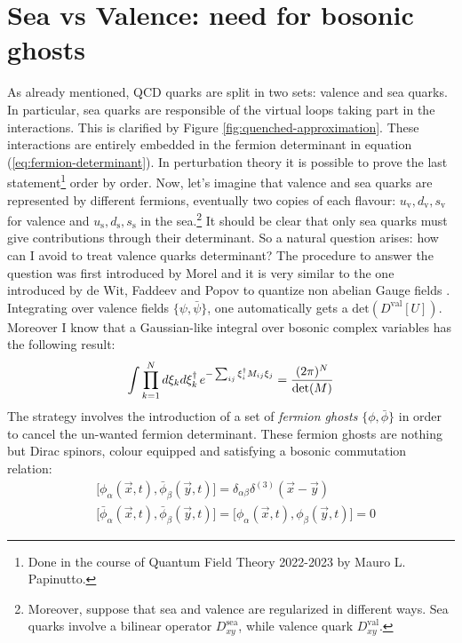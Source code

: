 \documentclass[english, LaM, oneside, noexaminfo]{sapthesis}
\begin{document}
\section{Sea vs Valence: need for bosonic ghosts}\label{sec:ghosts}
\noindent
As already mentioned, QCD quarks are split in two sets: valence and sea quarks.
In particular, sea quarks are responsible of the virtual loops taking part in the interactions.
This is clarified by Figure \ref{fig:quenched-approximation}.
These interactions are entirely embedded in the fermion determinant in equation (\ref{eq:fermion-determinant}).
In perturbation theory it is possible to prove the last statement\footnote{Done in the course of Quantum Field Theory 2022-2023 by Mauro L. Papinutto.} order by order.
Now, let's imagine that valence and sea quarks are represented by different fermions, eventually two copies of each flavour: $u_\text{v}, d_\text{v}, s_\text{v}$ for valence and $u_\text{s}, d_\text{s}, s_\text{s}$ in the sea.\footnote{Moreover, suppose that sea and valence are regularized in different ways. Sea quarks involve a bilinear operator $D^\text{sea}_{xy}$, while valence quark $D^\text{val}_{xy}$.}
It should be clear that only sea quarks must give contributions through their determinant.
So a natural question arises: how can I avoid to treat valence quarks determinant?
\newline
The procedure to answer the question was first introduced by Morel \cite{Morel} and it is very similar to the one introduced by de Wit, Faddeev and Popov to quantize non abelian Gauge fields \cite{WeinbergII}.
Integrating over valence fields $\{\psi,\bar\psi\}$, one automatically gets a $\text{det}(D^\text{val}[U])$. 
Moreover I know that a Gaussian-like integral over bosonic complex variables has the following result:
\begin{equation*}
    \int \prod_{k = 1}^{N} d \xi_k  d\xi_k^\dag \hspace*{.5mm} e^{-\sum_{ij} \xi_i^\dag M_{ij} \xi_j} = \frac{(2\pi)^N}{\text{det}(M)}
\end{equation*}
The strategy involves the introduction of a set of {\it fermion ghosts} $\{\phi, \bar\phi \}$ in order to cancel the un-wanted fermion determinant.
These fermion ghosts are nothing but Dirac spinors, colour equipped and satisfying a bosonic commutation relation:
\begin{equation*}
    \begin{aligned}
        & \big[\phi_\alpha (\vec x,t), \bar\phi_\beta (\vec y,t)\big] = \delta_{\alpha\beta}\delta^{(3)}(\vec x-\vec y) \\
        & \big[\bar\phi_\alpha (\vec x,t), \bar\phi_\beta (\vec y,t)\big] = \big[\phi_\alpha (\vec x,t), \phi_\beta (\vec y,t)\big] = 0
    \end{aligned}    
\end{equation*}
\end{document}
